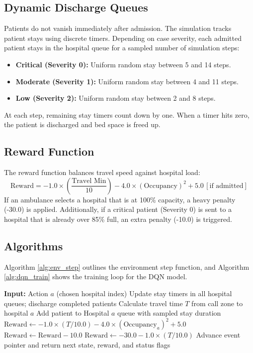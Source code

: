 \documentclass[11pt,a4paper]{article}
\begin{document}
\subsection{Dynamic Discharge Queues}
Patients do not vanish immediately after admission. The simulation tracks patient stays using discrete timers. Depending on case severity, each admitted patient stays in the hospital queue for a sampled number of simulation steps:
\begin{itemize}[leftmargin=*]
    \item \textbf{Critical (Severity 0):} Uniform random stay between 5 and 14 steps.
    \item \textbf{Moderate (Severity 1):} Uniform random stay between 4 and 11 steps.
    \item \textbf{Low (Severity 2):} Uniform random stay between 2 and 8 steps.
\end{itemize}
At each step, remaining stay timers count down by one. When a timer hits zero, the patient is discharged and bed space is freed up.

\subsection{Reward Function}
The reward function balances travel speed against hospital load:
\begin{equation}
    \text{Reward} = -1.0 \times \left(\frac{\text{Travel Min}}{10}\right) - 4.0 \times (\text{Occupancy})^2 + 5.0 \, [\text{if admitted}]
\end{equation}
If an ambulance selects a hospital that is at 100\% capacity, a heavy penalty (-30.0) is applied. Additionally, if a critical patient (Severity 0) is sent to a hospital that is already over 85\% full, an extra penalty (-10.0) is triggered.

\subsection{Algorithms}
Algorithm \ref{alg:env_step} outlines the environment step function, and Algorithm \ref{alg:dqn_train} shows the training loop for the DQN model.

\begin{algorithm}[H]
\caption{Environment Step and Dynamic Queue Update}
\label{alg:env_step}
\begin{algorithmic}[1]
\State \textbf{Input:} Action $a$ (chosen hospital index)
\State Update stay timers in all hospital queues; discharge completed patients
\State Calculate travel time $T$ from call zone to hospital $a$
    \State Add patient to Hospital $a$ queue with sampled stay duration
    \State $\text{Reward} \leftarrow -1.0 \times (T / 10.0) - 4.0 \times (\text{Occupancy}_a)^2 + 5.0$
        \State $\text{Reward} \leftarrow \text{Reward} - 10.0$
    \EndIf
\Else
    \State $\text{Reward} \leftarrow -30.0 - 1.0 \times (T / 10.0)$
\EndIf
\State Advance event pointer and return next state, reward, and status flags
\end{algorithmic}
\end{algorithm}
\end{document}
